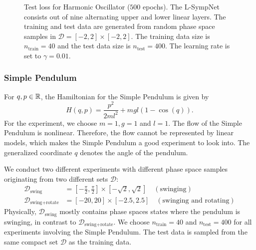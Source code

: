 \documentclass[twoside,a4paper]{article}
\begin{document}
\begin{figure}
\centering
{}
\caption{Test loss for Harmonic Oscillator ($500$ epochs). The L-SympNet consists out of nine alternating upper and 
lower linear layers. The training and test data are generated from random phase space samples in 
$\mathcal{D} = [-2,2] \times [-2,2]$. The training data size is $n_{\text{train}} = 40$
and the test data size is $n_{\text{test}}=400$.
The learning rate is set to $\gamma = 0.01$.}\label{fig_harm_osc_loss}
\end{figure}

\subsubsection{Simple Pendulum}

For $q,p \in \mathbb{R}$, the Hamiltonian for the Simple Pendulum is given by
\begin{equation*}
	H(q,p) = \frac{p^2}{2ml^2} + mgl (1-\cos(q))
	.
\end{equation*}
For the experiment, we choose $m=1, g=1$ and $l=1$. The flow of the Simple Pendulum is nonlinear.
Therefore, the flow cannot be represented by linear models, which makes the Simple Pendulum
a good experiment to look into. The generalized coordinate $q$ denotes the angle of the pendulum.

We conduct two different experiments with different
phase space samples originating from two different sets $\mathcal{D}$:
\begin{align*}
	\mathcal{D}_{\text{swing}} &= [-\frac{\pi}{2}, \frac{\pi}{2}] \times [-\sqrt{2}, \sqrt{2}]
	\quad (\text{swinging}) \\
	\mathcal{D}_{\text{swing+rotate}} &= [-20, 20] \times [-2.5, 2.5]
	\quad (\text{swinging and rotating})
\end{align*}
Physically, $\mathcal{D}_{\text{swing}}$ mostly contains phase spaces states where
the pendulum is swinging, in contrast to $\mathcal{D}_{\text{swing+rotate}}$.
We choose $n_{\text{train}} = 40$ and $n_{\text{test}} = 400$ for all experiments involving
the Simple Pendulum. The test data is sampled from the same compact set $\mathcal{D}$ as the training data.
\end{document}
